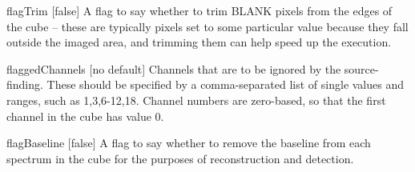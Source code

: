 \begin{Lentry}
\item[{flagTrim [false]}] A flag to say whether to trim
  BLANK pixels from the edges of the cube -- these are typically
  pixels set to some particular value because they fall outside the
  imaged area, and trimming them can help speed up the execution.
\item[{flaggedChannels [no default]}] Channels that are to be ignored
  by the source-finding. These should be specified by a
  comma-separated list of single values and ranges, such as
  1,3,6-12,18. Channel numbers are zero-based, so that the first
  channel in the cube has value 0.
\item[{flagBaseline [false]}] A flag to say whether to remove
  the baseline from each spectrum in the cube for the purposes of
  reconstruction and detection.
\end{Lentry}


